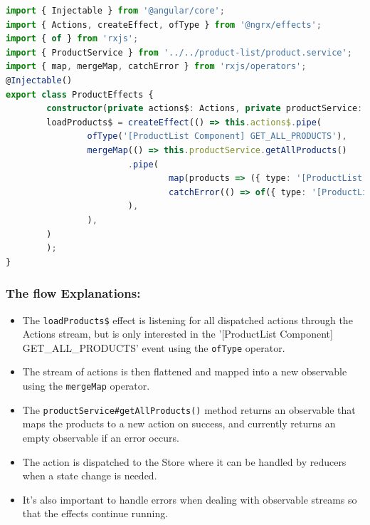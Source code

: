 \documentclass{report}
\begin{document}
\begin{itemize}
		\begin{lstlisting}[language=Typescript, caption=product-effects.ts]
		import { Injectable } from '@angular/core';
import { Actions, createEffect, ofType } from '@ngrx/effects';
import { of } from 'rxjs';
import { ProductService } from '../../product-list/product.service';
import { map, mergeMap, catchError } from 'rxjs/operators';
@Injectable()
export class ProductEffects {
		constructor(private actions$: Actions, private productService: ProductService) { }
		loadProducts$ = createEffect(() => this.actions$.pipe(
				ofType('[ProductList Component] GET_ALL_PRODUCTS'),
				mergeMap(() => this.productService.getAllProducts()
						.pipe(
								map(products => ({ type: '[ProductList Component] GET_ALL_PRODUCTS SUCCESS', allProducts: products })),
								catchError(() => of({ type: '[ProductList Component] GET_ALL_PRODUCTS ERROR', errorMessage: 'No Products Found' }))
						),
				),
		)
		);
}
\end{lstlisting}
\end{itemize}

\subsubsection*{The flow Explanations:}
\begin{itemize}
	\item{The \lstinline{loadProducts$} effect is listening for all dispatched actions through the Actions stream, but is only interested in the '[ProductList Component] GET\_ALL\_PRODUCTS' event using the \lstinline{ofType} operator.}
	\item{The stream of actions is then flattened and mapped into a new observable using the \lstinline{mergeMap} operator.}
	\item{The \lstinline{productService#getAllProducts()} method returns an observable that maps the products to a new action on success, and currently returns an empty observable if an error occurs.}
	\item{The action is dispatched to the Store where it can be handled by reducers when a state change is needed.}
	\item{It's also important to handle errors when dealing with observable streams so that the effects continue running.}
\end{itemize}
\end{document}
